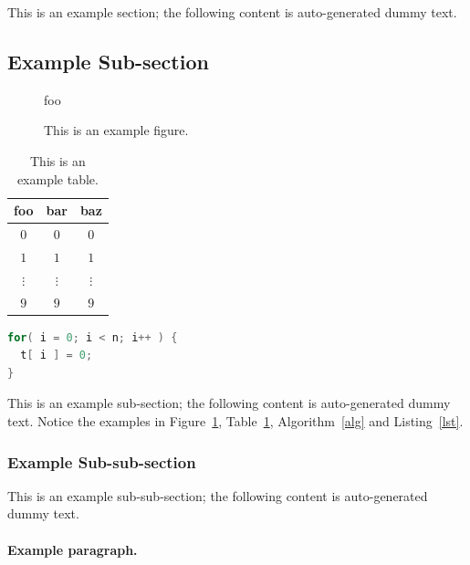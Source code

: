\documentclass[ %
                    author={Revalda Putawara},
                supervisor={Dr. James Pope},
                    degree={MSc},
                     title={Robustness of Bayesian Neural Networks Design Choices Against Weight and Bias Perturbation Induced by Single Event Upsets (SEUs)},
                      type={},
                      year={2025}]{dissertation}
\begin{document}
This is an example section; 
the following content is auto-generated dummy text.
\lipsum

\subsection{Example Sub-section}

\begin{figure}[t]
\centering
foo
\caption{This is an example figure.}
\label{fig}
\end{figure}

\begin{table}[t]
\centering
\begin{tabular}{|cc|c|}
\hline
foo      & bar      & baz      \\
\hline
$0     $ & $0     $ & $0     $ \\
$1     $ & $1     $ & $1     $ \\
$\vdots$ & $\vdots$ & $\vdots$ \\
$9     $ & $9     $ & $9     $ \\
\hline
\end{tabular}
\caption{This is an example table.}
\label{tab}
\end{table}

\begin{algorithm}[t]
\caption{This is an example algorithm.}
\label{alg}
\end{algorithm}

\begin{lstlisting}[float={t},caption={This is an example listing.},label={lst},language=C]
for( i = 0; i < n; i++ ) {
  t[ i ] = 0;
}
\end{lstlisting}

This is an example sub-section;
the following content is auto-generated dummy text.
Notice the examples in Figure~\ref{fig}, Table~\ref{tab}, Algorithm~\ref{alg}
and Listing~\ref{lst}.
\lipsum

\subsubsection{Example Sub-sub-section}

This is an example sub-sub-section;
the following content is auto-generated dummy text.
\lipsum

\paragraph{Example paragraph.}
\end{document}
